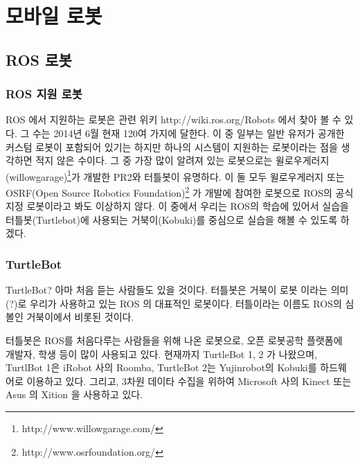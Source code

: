 
\chapter{모바일 로봇}

\section{ROS 로봇}

\subsection{ROS 지원 로봇}

ROS 에서 지원하는 로봇은 관련 위키 http://wiki.ros.org/Robots 에서 찾아 볼 수 있다. 그 수는 2014년 6월 현재 120여 가지에 달한다. 이 중 일부는 일반 유저가 공개한 커스텀 로봇이 포함되어 있기는 하지만 하나의 시스템이 지원하는 로봇이라는 점을 생각하면 적지 않은 수이다. 그 중 가장 많이 알려져 있는 로봇으로는 윌로우게러지(willowgarage)\footnote{http://www.willowgarage.com/}가 개발한 PR2와 터틀봇이 유명하다. 이 둘 모두 윌로우게러지 또는 OSRF(Open Source Robotics Foundation)\footnote{http://www.osrfoundation.org/} 가 개발에 참여한 로봇으로 ROS의 공식 지정 로봇이라고 봐도 이상하지 않다. 이 중에서 우리는 ROS의 학습에 있어서 실습을 터틀봇(Turtlebot)에 사용되는 거북이(Kobuki)를 중심으로 실습을 해볼 수 있도록 하겠다.

\subsection{TurtleBot}

TurtleBot? 아마 처음 듣는 사람들도 있을 것이다. 터틀봇은 거북이 로봇 이라는 의미(?)로 우리가 사용하고 있는 ROS 의 대표적인 로봇이다. 터틀이라는 이름도 ROS의 심볼인 거북이에서 비롯된 것이다. 

터틀봇은 ROS를 처음다루는 사람들을 위해 나온 로봇으로, 오픈 로봇공학 플랫폼에 개발자, 학생 등이 많이 사용되고 있다. 현재까지 TurtleBot 1, 2 가 나왔으며, TurtlBot 1은 iRobot 사의 Roomba, TurtleBot 2는 Yujinrobot의 Kobuki를 하드웨어로 이용하고 있다. 그리고, 3차원 데이타 수집을 위하여 Microsoft 사의 Kinect 또는 Asus 의 Xition 을 사용하고 있다.

